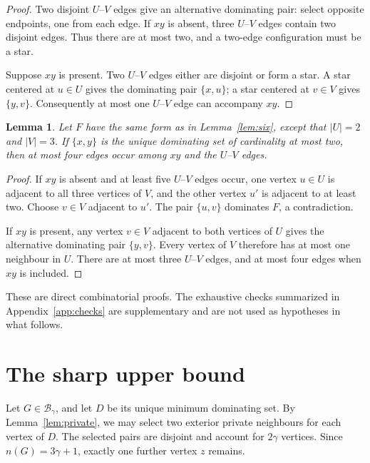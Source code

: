 \documentclass[11pt]{article}
\newtheorem{lemma}[theorem]{Lemma}
\theoremstyle{definition}
\theoremstyle{remark}
\begin{document}
\begin{proof}
Two disjoint $U$--$V$ edges give an alternative dominating pair: select
opposite endpoints, one from each edge. If $xy$ is absent, three
$U$--$V$ edges contain two disjoint edges. Thus there are at most two, and a
two-edge configuration must be a star.

Suppose $xy$ is present. Two $U$--$V$ edges either are disjoint or form a
star. A star centered at $u\in U$ gives the dominating pair $\{x,u\}$;
a star centered at $v\in V$ gives $\{y,v\}$. Consequently at most one
$U$--$V$ edge can accompany $xy$.
\end{proof}

\begin{lemma}\label{lem:seven}
Let $F$ have the same form as in Lemma~\ref{lem:six}, except that $|U|=2$
and $|V|=3$. If $\{x,y\}$ is the unique dominating set of cardinality at
most two, then at most four edges occur among $xy$ and the $U$--$V$ edges.
\end{lemma}

\begin{proof}
If $xy$ is absent and at least five $U$--$V$ edges occur, one vertex
$u\in U$ is adjacent to all three vertices of $V$, and the other vertex
$u'$ is adjacent to at least two. Choose $v\in V$ adjacent to $u'$.
The pair $\{u,v\}$ dominates $F$, a contradiction.

If $xy$ is present, any vertex $v\in V$ adjacent to both vertices of $U$
gives the alternative dominating pair $\{y,v\}$. Every vertex of $V$
therefore has at most one neighbour in $U$. There are at most three
$U$--$V$ edges, and at most four edges when $xy$ is included.
\end{proof}

These are direct combinatorial proofs. The exhaustive checks summarized in
Appendix~\ref{app:checks} are supplementary and are not used as hypotheses in
what follows.

\section{The sharp upper bound}\label{sec:upper}

Let $G\in\mathcal B_\gamma$, and let $D$ be its unique minimum dominating set.
By Lemma~\ref{lem:private}, we may select two exterior private neighbours for
each vertex of $D$. The selected pairs are disjoint and account for $2\gamma$
vertices. Since $n(G)=3\gamma+1$, exactly one further vertex $z$ remains.
\end{document}
